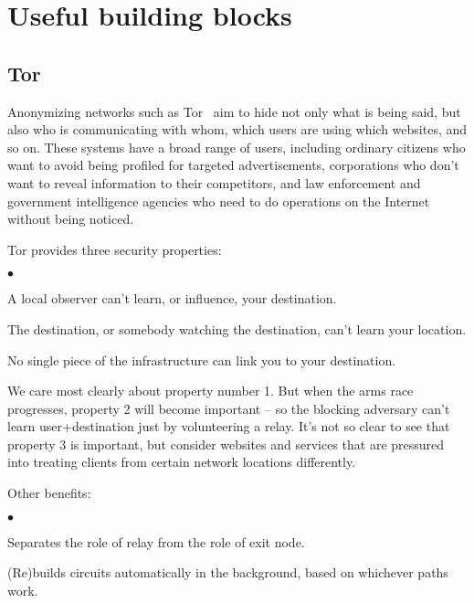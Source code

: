 \documentclass{llncs}
\newenvironment{tightlist}{\begin{list}{$\bullet$}{
  \setlength{\itemsep}{0mm}
    \setlength{\parsep}{0mm}
    }}{\end{list}}
\begin{document}

\section{Useful building blocks}

\subsection{Tor}

Anonymizing networks such as
Tor~\cite{tor-design}
aim to hide not only what is being said, but also who is
communicating with whom, which users are using which websites, and so on.
These systems have a broad range of users, including ordinary citizens
who want to avoid being profiled for targeted advertisements, corporations
who don't want to reveal information to their competitors, and law
enforcement and government intelligence agencies who need
to do operations on the Internet without being noticed.

Tor provides three security properties:
\begin{tightlist}
\item A local observer can't learn, or influence, your destination.
\item The destination, or somebody watching the destination, can't learn
your location.
\item No single piece of the infrastructure can link you to your
destination.
\end{tightlist}

We care most clearly about property number 1. But when the arms race
progresses, property 2 will become important -- so the blocking adversary
can't learn user+destination just by volunteering a relay. It's not so
clear to see that property 3 is important, but consider websites and
services that are pressured into treating clients from certain network
locations differently.

Other benefits:

\begin{tightlist}
\item Separates the role of relay from the role of exit node.

\item (Re)builds circuits automatically in the background, based on
whichever paths work.
\end{tightlist}
\end{document}
